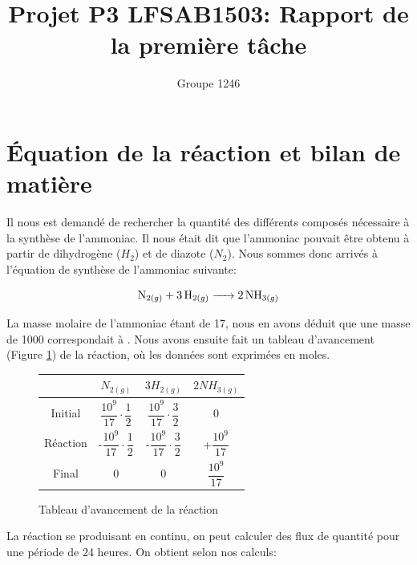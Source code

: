 \documentclass[11pt,a4paper]{report}
\author{Groupe 1246}
\title{Projet P3 LFSAB1503: Rapport de la première tâche}
\begin{document}
\maketitle

\section*{Équation de la réaction et bilan de matière}

Il nous est demandé de rechercher la quantité des différents composés nécessaire à la synthèse de l'ammoniac.
Il nous était dit que l'ammoniac pouvait être obtenu à partir de dihydrogène ($H_2$) et de diazote ($N_2$).
Nous sommes donc arrivés à l'équation de synthèse de l'ammoniac suivante: 


 $$\ce{N_{2(g)} + 3H_{2(g)} -> 2NH_{3(g)}}$$

La masse molaire de l'ammoniac étant de \unit{17}{\gram\per\mole}, nous en avons déduit que une masse de \unit{1000}{\ton}
correspondait à \unit{}{\mole}. Nous avons ensuite fait un tableau d'avancement (Figure \ref{tableau}) de la réaction,
où les données sont exprimées en moles.

\begin{figure}[h]
\centering
\begin{tabular}{|c|c|c|c|}
\hline 
 & $N_{2(g)}$ & $3H_{2(g)} $ & $2NH_{3(g)}$ \\ 
\hline 
Initial & $\dfrac{10^{9}}{17} \cdot \dfrac{1}{2}$ & $\dfrac{10^{9}}{17} \cdot \dfrac{3}{2}$ & 0 \\ 
\hline 
Réaction & -$\dfrac{10^{9}}{17} \cdot \dfrac{1}{2}$ & -$\dfrac{10^{9}}{17} \cdot \dfrac{3}{2}$ & +$\dfrac{10^{9}}{17}$ \\ 
\hline 
Final & 0 & 0 & $\dfrac{10^{9}}{17}$ \\ 
\hline 
\end{tabular} 
\caption{Tableau d'avancement de la réaction}
\label{tableau}
\end{figure}

La réaction se produisant en continu, on peut calculer des flux de quantité pour une période de 24 heures.
On obtient selon nos calculs:

\begin{itemize}
  \item{une consommation de $N_2$ égale à: $\dfrac{10^{9}}{17} \cdot \dfrac{1}{2} \cdot \dfrac{1}{3600 \cdot 24} \cong 340.41 $ \unit{}{\mole\per\second}.}
  \item{une consommation de $H_2$ égale à: $\dfrac{10^{9}}{17} \cdot \dfrac{3}{2} \cdot \dfrac{1}{3600 \cdot 24} \cong 1021.241 $\unit{}{\mole\per\second}
  \item{une production de $NH_3$ égale à: $\dfrac{10^{9}}{17}} \cdot \dfrac{1}{3600 \cdot 24} \cong 680.827$ \unit{}{\mole\per\second}
}}\end{itemize}
\end{document}
